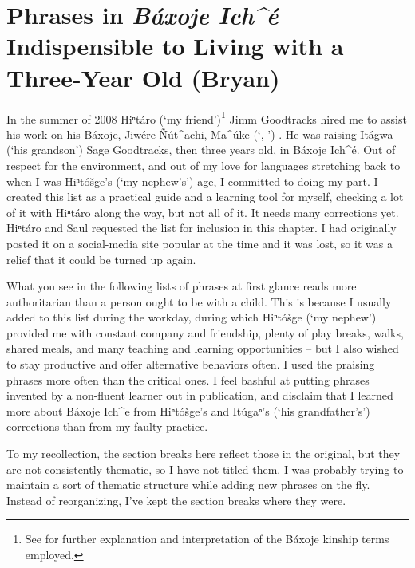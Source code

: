 \documentclass[output=paper]{LSP/langsci}
\begin{document}
\section{Phrases in \emph{Báxoje Ich\^{ }é} Indispensible to Living with a Three-Year Old (Bryan)}\label{bryan}
	In the summer of 2008 Hiⁿtáro (`my friend')\footnote{See  for further explanation and interpretation of the Báxoje kinship terms employed.} Jimm Goodtracks hired me to assist his work on his Báxoje, Jiwére-\~Nút\^{ }achi, Ma\^{ }úke (`, ') . He was raising Itágwa (`his grandson') Sage Goodtracks, then three years old, in Báxoje Ich\^{ }é. Out of respect for the  environment, and out of my love for languages stretching back to when I was Hiⁿtóšge's (`my nephew's') age, I committed to doing my part. I created this list as a practical guide and a learning tool for myself, checking a lot of it with Hiⁿtáro along the way, but not all of it. It needs many corrections yet. Hiⁿtáro and Saul requested the list for inclusion in this chapter. I had originally posted it on a social-media site popular at the time and it was lost, so it was a relief that it could be turned up again. 

What you see in the following lists of phrases
at first glance reads more authoritarian than a person ought to be with a child. This is because I usually added to this list during the workday, during which Hiⁿtóšge (`my nephew') provided me with constant company and friendship, plenty of play breaks, walks, shared meals, and many teaching and learning opportunities -- but I also wished to stay productive and offer alternative behaviors often. I used the praising phrases more often than the critical ones. I feel bashful at putting phrases invented by a non-fluent learner out in publication, and disclaim that I learned more about Báxoje Ich\^{ }e from Hiⁿtóšge's and Itúgaⁿ's (`his grandfather's') corrections than from my faulty practice. 

To my recollection, the section breaks here reflect those in the original, but they are not consistently thematic, so I have not titled them. I was probably trying to maintain a sort of thematic structure while adding new phrases on the fly. Instead of reorganizing, I've kept the section breaks where they were.

\end{document}
